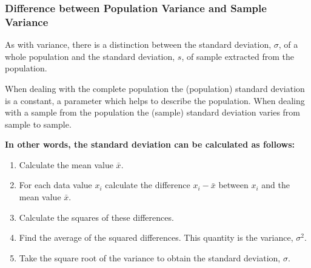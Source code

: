 \subsubsection{Difference between Population Variance and Sample Variance}
As with variance, there is a distinction between the standard deviation, $\sigma$, of a whole population and the standard deviation, $s$, of sample extracted from the population.

When dealing with the complete population the (population) standard deviation is a constant, a parameter which helps to describe the population. When dealing with a sample from the population the (sample) standard deviation varies from sample to sample. \newline

\textbf{In other words, the standard deviation can be calculated as follows:}

\begin{enumerate}
\item Calculate the mean value $\bar{x}$.
\item For each data value $x_i$ calculate the difference $x_i - \bar{x}$ between $x_i$ and the mean value $\bar{x}$.
\item Calculate the squares of these differences.
\item Find the average of the squared differences. This quantity is the variance, $\sigma^2$.
\item Take the square root of the variance to obtain the standard deviation, $\sigma$.
\end{enumerate}

